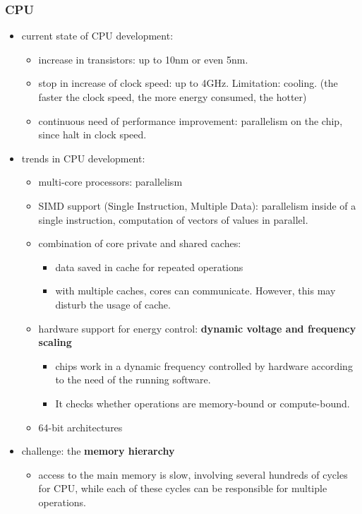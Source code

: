 \subsubsection{CPU}
\begin{itemize}
	\item current state of CPU development:
	\begin{itemize}
		\item increase in transistors: up to 10nm or even 5nm.
		\item stop in increase of clock speed: up to 4GHz. Limitation: cooling. (the faster the clock speed, the more energy consumed, the hotter) 
		\item continuous need of performance improvement: parallelism on the chip, since halt in clock speed.
	\end{itemize}
	\item trends in CPU development:
	\begin{itemize}
		\item multi-core processors: parallelism
		\item SIMD support (Single Instruction, Multiple Data): parallelism inside of a single instruction, computation of vectors of values in parallel.
		\item combination of core private and shared caches:
		\begin{itemize}
			\item data saved in cache for repeated operations
			\item with multiple caches, cores can communicate. However, this may disturb the usage of cache.
			
		\end{itemize}
		\item hardware support for energy control: \textbf{dynamic voltage and frequency scaling}  
		\begin{itemize}
			\item chips work in a dynamic frequency controlled by hardware according to the need of the running software. 
			\item It checks whether operations are memory-bound or compute-bound.
		\end{itemize}
		   
		\item 64-bit architectures
		  
	\end{itemize}
	\item challenge: the \textbf{memory hierarchy}
	\begin{itemize}
		\item access to the main memory is slow, involving several hundreds of cycles for CPU, while each of these cycles can be responsible for multiple operations.
		

\end{itemize}
\end{itemize}
